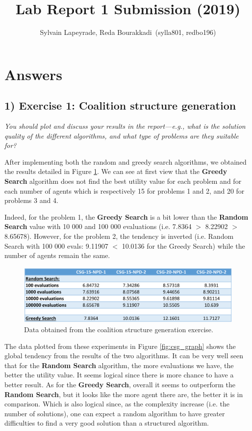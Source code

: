 \documentclass[10pt]{article}
\title {Lab Report 1 Submission (2019)}
\author{Sylvain Lapeyrade, Reda Bourakkadi\, (sylla801, redbo196)}
\begin{document}
\maketitle

\section*{Answers}

\subsection*{1) \textbf{ Exercise 1: Coalition structure generation}}
\textit {You should plot and discuss your results in the report—e.g.,
 what is the solution quality of the different algorithms,
  and what type of problems are they suitable for?} \medskip

 After implementing both the random and greedy search algorithms, we obtained
  the results detailed in Figure \ref{fig:csg_data}. We can see at first view
  that the \textbf{Greedy Search} algorithm does not find the best utility value for each
  problem and for each number of agents which is respectively 15 for problems 1 and 2,
  and 20 for problems 3 and 4. \medskip

 Indeed, for the problem 1, the \textbf{Greedy Search} is a bit lower than the 
  \textbf{Random Search} value with 10 000 and 100 000 evaluations (i.e. 7.8364 $>$ 
  8.22902 $>$ 8.65678). However, for the problem 2, the tendency is inverted (i.e. Random
  Search with 100 000 evals: 9.11907 $<$ 10.0136 for the Greedy Search) while
  the number of agents remain the same.  

 \begin{figure}[ht!]
 \includegraphics[width=\linewidth]{csg_data.png}
 \caption{Data obtained from the coalition structure generation exercise.}
 \label{fig:csg_data}
 \end{figure}

 The data plotted from these experiments in Figure \ref{fig:csg_graph} shows the global
  tendency from the results of the two algorithms. It can be very well seen that for the
  \textbf{Random Search} algorithm, the more evaluations we have, the better the utility
  value. It seems logical since there is more chance to have a better result. As for the
  \textbf{Greedy Search}, overall it seems to outperform the \textbf{Random Search}, but
  it looks like the more agent there are, the better it is in comparison. Which is also
  logical since, as the complexity increase (i.e. the number of solutions), one can expect 
  a random algorithm to have greater difficulties to find a very good solution than a
  structured algorithm.
\end{document}

